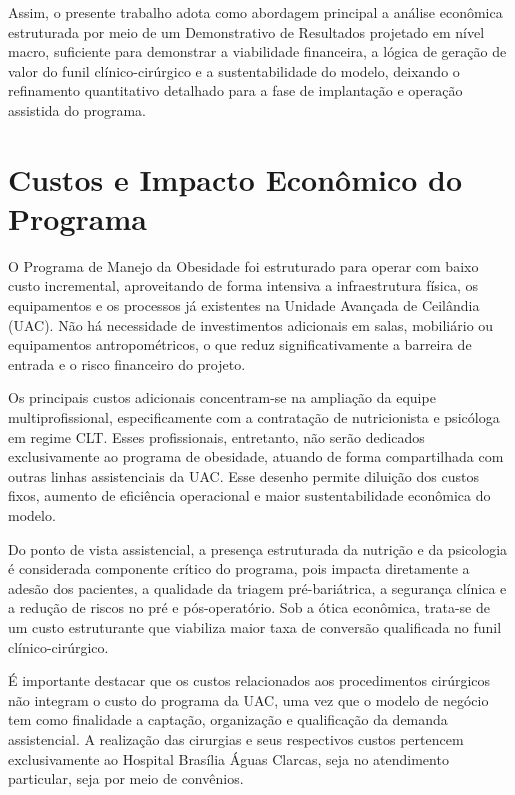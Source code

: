 \documentclass[12pt]{article}
\begin{document}
Assim, o presente trabalho adota como abordagem principal a análise econômica estruturada por meio de um Demonstrativo de Resultados projetado em nível macro, suficiente para demonstrar a viabilidade financeira, a lógica de geração de valor do funil clínico-cirúrgico e a sustentabilidade do modelo, deixando o refinamento quantitativo detalhado para a fase de implantação e operação assistida do programa.

\FGVNewPage

\section{Custos e Impacto Econômico do Programa}
\label{sec:orge7589b1}
O Programa de Manejo da Obesidade foi estruturado para operar com baixo custo incremental, aproveitando de forma intensiva a infraestrutura física, os equipamentos e os processos já existentes na Unidade Avançada de Ceilândia (UAC). Não há necessidade de investimentos adicionais em salas, mobiliário ou equipamentos antropométricos, o que reduz significativamente a barreira de entrada e o risco financeiro do projeto.

Os principais custos adicionais concentram-se na ampliação da equipe multiprofissional, especificamente com a contratação de nutricionista e psicóloga em regime CLT. Esses profissionais, entretanto, não serão dedicados exclusivamente ao programa de obesidade, atuando de forma compartilhada com outras linhas assistenciais da UAC. Esse desenho permite diluição dos custos fixos, aumento de eficiência operacional e maior sustentabilidade econômica do modelo.

Do ponto de vista assistencial, a presença estruturada da nutrição e da psicologia é considerada componente crítico do programa, pois impacta diretamente a adesão dos pacientes, a qualidade da triagem pré-bariátrica, a segurança clínica e a redução de riscos no pré e pós-operatório. Sob a ótica econômica, trata-se de um custo estruturante que viabiliza maior taxa de conversão qualificada no funil clínico-cirúrgico.

É importante destacar que os custos relacionados aos procedimentos cirúrgicos não integram o custo do programa da UAC, uma vez que o modelo de negócio tem como finalidade a captação, organização e qualificação da demanda assistencial. A realização das cirurgias e seus respectivos custos pertencem exclusivamente ao Hospital Brasília Águas Clarcas, seja no atendimento particular, seja por meio de convênios.
\end{document}
